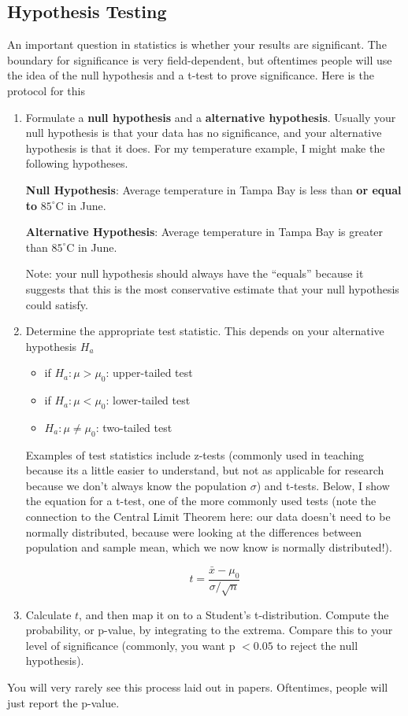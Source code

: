 \documentclass{article}
\begin{document}
\subsection{Hypothesis Testing}
An important question in statistics is whether your results are significant. The boundary for significance is very field-dependent, but oftentimes people will use the idea of the null hypothesis and a t-test to prove significance. Here is the protocol for this
\begin{enumerate}
\item\label{item:4} Formulate a \textbf{null hypothesis} and a \textbf{alternative hypothesis}. Usually your null hypothesis is that your data has no significance, and your alternative hypothesis is that it does. For my temperature example, I might make the following hypotheses.

  \textbf{Null Hypothesis}: Average temperature in Tampa Bay is less than \textbf{or equal to} $85^{\circ}$C in June.

  \textbf{Alternative Hypothesis}: Average temperature in Tampa Bay is greater than $85^{\circ}$C in June.

  Note: your null hypothesis should always have the ``equals'' because it suggests that this is the most conservative estimate that your null hypothesis could satisfy.
  
\item Determine the appropriate test statistic. This depends on your alternative hypothesis $H_a$

\begin{itemize}
\item if $H_a:\mu>\mu_0$: upper-tailed test
\item if $H_a:\mu<\mu_0$: lower-tailed test
\item $H_a:\mu\neq\mu_0$: two-tailed test
\end{itemize}


Examples of test statistics include z-tests (commonly used in teaching because its a little easier to understand, but not as applicable for research because we don't always know the population $\sigma$) and t-tests. Below, I show the equation for a t-test, one of the more commonly used tests (note the connection to the Central Limit Theorem here: our data doesn't need to be normally distributed, because were looking at the differences between population and sample mean, which we now know is normally distributed!). 

\begin{equation}
\label{eq:15}
t = \frac{\bar{x}-\mu_0}{\sigma / \sqrt{n}}
\end{equation}

\item Calculate $t$, and then map it on to a Student's t-distribution. Compute the probability, or p-value, by integrating to the extrema. Compare this to your level of significance (commonly, you want p $< 0.05$ to reject the null hypothesis).
  
\end{enumerate}  
You will very rarely see this process laid out in papers. Oftentimes, people will just report the p-value. 
\end{document}
